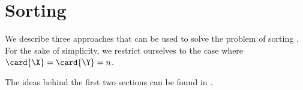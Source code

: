 \chapter{Sorting \XY}

We describe three approaches that can be used to solve the problem
of sorting \XY. For the sake of simplicity,
we restrict ourselves to the case where $\card{\X} = \card{\Y} = n$.

The ideas behind the first two sections can be found in \citet*{harper:1975}.
